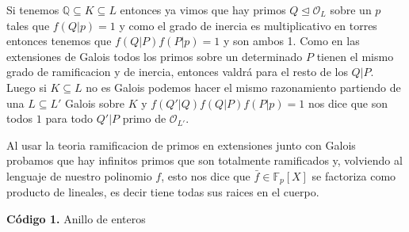 \documentclass[12pt]{amsart}
\newcommand{\QQ}{\mathbb{Q}}
\newcommand{\FF}{\mathbb{F}}
\newcommand{\OO}{\mathcal{O}}
\theoremstyle{plain}
\begin{document}
Si tenemos $\QQ\subseteq K\subseteq L$ entonces ya vimos que hay primos
$Q \unlhd \OO_L$ sobre un $p$ tales que $f(Q | p)=1$ y como el grado 
de inercia es multiplicativo en torres entonces 
tenemos que $f(Q | P)f(P|p)=1$ y son ambos 1. Como en las extensiones de 
Galois todos los primos sobre un determinado $P$ tienen el mismo grado 
de ramificacion y de inercia, entonces valdrá para el resto de los $Q|P$.
Luego si $K\subseteq L$ no es Galois podemos hacer el mismo razonamiento
partiendo de una $L\subseteq L'$ Galois sobre $K$ y $f(Q' | Q)f(Q | P)
f(P|p)=1$ nos dice que son todos $1$ para todo $Q'|P$ primo de $\OO_{L'}$.

Al usar la teoria ramificacion de primos en extensiones junto con Galois probamos que hay infinitos primos que son totalmente ramificados y, volviendo al lenguaje de nuestro polinomio $f$, esto nos dice que $\bar{f}\in \FF_p[X]$ se factoriza como producto de lineales, es decir tiene todas sus raices en el cuerpo.







\newpage

\vspace{1em}
\noindent\textbf{Código 1.} Anillo de enteros
\label{codigo1}

\lstset{
    language=Python,
    basicstyle=\ttfamily\small,
    frame=single,
    breaklines=true
}
\end{document}
